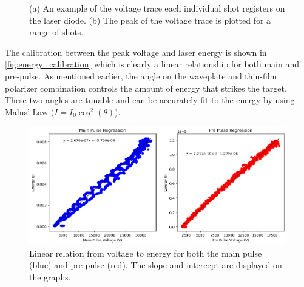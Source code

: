 \begin{figure}
	\centering 
	\caption{(a) An example of the voltage trace each individual shot registers on the laser diode. (b) The peak of the voltage trace is plotted for a range of shots.}
\end{figure}

The calibration between the peak voltage and laser energy is shown in \autoref{fig:energy_calibration} which is clearly a linear relationship for both main and pre-pulse. As mentioned earlier, the angle on the waveplate and thin-film polarizer combination controls the amount of energy that strikes the target. These two angles are tunable and can be accurately fit to the energy by using Malus' Law ($I = I_0 \cos^2(\theta)$).

\begin{figure}
	\centering 
	\includegraphics[width=0.9\linewidth]{planning/images/daq/energy_calibration.png}
	\caption{Linear relation from voltage to energy for both the main pulse (blue) and pre-pulse (red). The slope and intercept are displayed on the graphs.}
	\label{fig:energy_calibration}
\end{figure}


